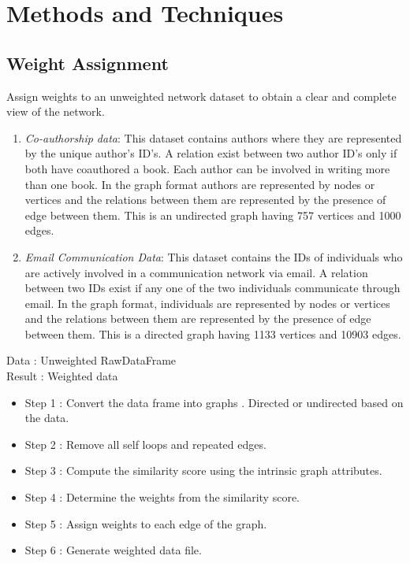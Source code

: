 \section{Methods and Techniques}

\subsection{Weight Assignment}

Assign weights to an unweighted network dataset to obtain a clear and complete view of the network.

\begin{enumerate}
\item {\em Co-authorship data}: This dataset contains authors where they are represented by the unique author's ID's.
A relation exist between two author ID's only if both have coauthored a book. Each author can be involved
in writing more than one book. In the graph format authors are represented by nodes or vertices and the
relations between them are represented by the presence of edge between them.
This is an undirected graph having 757 vertices and 1000 edges. 

\item {\em Email Communication Data}: This dataset contains the IDs of individuals who are actively involved
in a communication network via email. A relation between two IDs exist if any one of the two individuals
communicate through email. In the graph format, individuals are represented by nodes or vertices and the
relations between them are represented by the presence of edge between them. This is a directed graph having 1133 vertices and 10903 edges.
\end{enumerate}


\noindent Data : Unweighted RawDataFrame\\
\noindent Result : Weighted data

\begin{itemize}
\item Step 1 : Convert the data frame into graphs . Directed or undirected based on the data.
\item Step 2 : Remove all self loops and repeated edges.
\item Step 3 : Compute the similarity score using the intrinsic graph attributes.
\item Step 4 : Determine the weights from the similarity score.
\item Step 5 : Assign weights to each edge of the graph.
\item Step 6 : Generate weighted data file.
\end{itemize}

